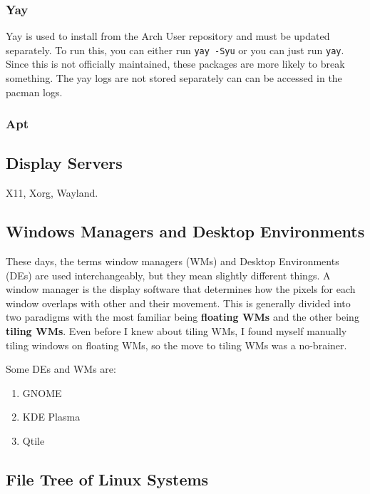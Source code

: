 \documentclass{article}
\theoremstyle{definition}
\begin{document}
    \subsubsection{Yay}

      Yay is used to install from the Arch User repository and must be updated separately. To run this, you can either run \texttt{yay -Syu} or you can just run \texttt{yay}. Since this is not officially maintained, these packages are more likely to break something. The yay logs are not stored separately can can be accessed in the pacman logs. 

    \subsubsection{Apt}  
  
  \subsection{Display Servers}

    X11, Xorg, Wayland.

  \subsection{Windows Managers and Desktop Environments}

  These days, the terms window managers (WMs) and Desktop Environments (DEs) are used interchangeably, but they mean slightly different things. A window manager is the display software that determines how the pixels for each window overlaps with other and their movement. This is generally divided into two paradigms with the most familiar being \textbf{floating WMs} and the other being \textbf{tiling WMs}. Even before I knew about tiling WMs, I found myself manually tiling windows on floating WMs, so the move to tiling WMs was a no-brainer. 
  
  Some DEs and WMs are: 
  \begin{enumerate}
    \item GNOME 
    \item KDE Plasma
    \item Qtile
  \end{enumerate}

  \subsection{File Tree of Linux Systems}
\end{document}
